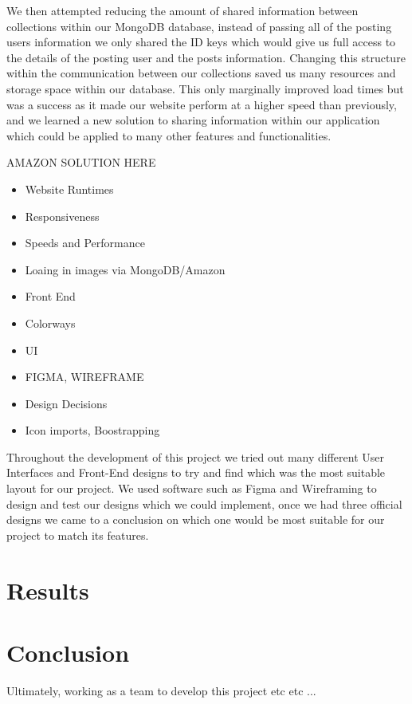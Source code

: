 We then attempted reducing the amount of shared information between collections within our MongoDB database, instead of passing all of the posting users information we only shared the ID keys which would give us full access to the details of the posting user and the posts information. Changing this structure within the communication between our collections saved us many resources and storage space within our database. This only marginally improved load times but was a success as it made our website perform at a higher speed than previously, and we learned a new solution to sharing information within our application which could be applied to many other features and functionalities.
\newline

AMAZON SOLUTION HERE
\newline

\begin{itemize}
    \item Website Runtimes
    \item Responsiveness
    \item Speeds and Performance
    \item Loaing in images via MongoDB/Amazon
\end{itemize}


\begin{itemize}
    \item Front End
    \item Colorways
    \item UI
    \item FIGMA, WIREFRAME
    \item Design Decisions
    \item Icon imports, Boostrapping
\end{itemize}

Throughout the development of this project we tried out many different User Interfaces and Front-End designs to try and find which was the most suitable layout for our project. We used software such as Figma and Wireframing to design and test our designs which we could implement, once we had three official designs we came to a conclusion on which one would be most suitable for our project to match its features.

\chapter{Results}

\chapter{Conclusion}
Ultimately, working as a team to develop this project etc etc ...


